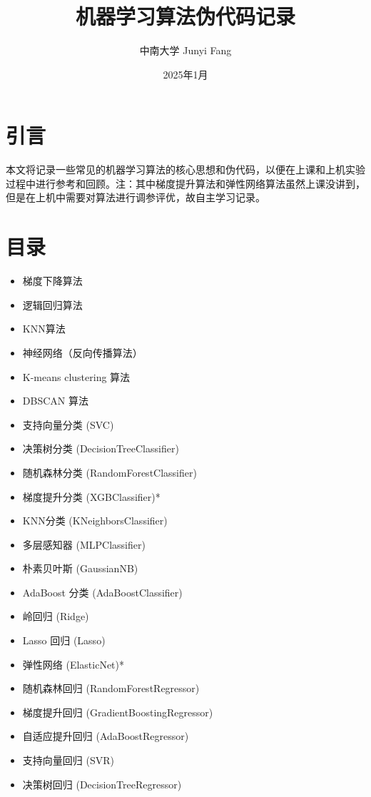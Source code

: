 \documentclass{article}
\title{机器学习算法伪代码记录}
\author{中南大学 Junyi Fang}
\date{2025年1月}
\begin{document}
\maketitle

\section{引言}
本文将记录一些常见的机器学习算法的核心思想和伪代码，以便在上课和上机实验过程中进行参考和回顾。注：其中梯度提升算法和弹性网络算法虽然上课没讲到，但是在上机中需要对算法进行调参评优，故自主学习记录。

\section{目录}
\begin{itemize}
    \item 梯度下降算法
    \item 逻辑回归算法
    \item KNN算法
    \item 神经网络（反向传播算法）
    \item K-means clustering 算法
    \item DBSCAN 算法
    \item 支持向量分类 (SVC)
    \item 决策树分类 (DecisionTreeClassifier)
    \item 随机森林分类 (RandomForestClassifier)
    \item 梯度提升分类 (XGBClassifier)*
    \item KNN分类 (KNeighborsClassifier)
    \item 多层感知器 (MLPClassifier)
    \item 朴素贝叶斯 (GaussianNB)
    \item AdaBoost 分类 (AdaBoostClassifier)
    \item 岭回归 (Ridge)
    \item Lasso 回归 (Lasso)
    \item 弹性网络 (ElasticNet)*
    \item 随机森林回归 (RandomForestRegressor)
    \item 梯度提升回归 (GradientBoostingRegressor)
    \item 自适应提升回归 (AdaBoostRegressor)
    \item 支持向量回归 (SVR)
    \item 决策树回归 (DecisionTreeRegressor)
\end{itemize}
\end{document}
